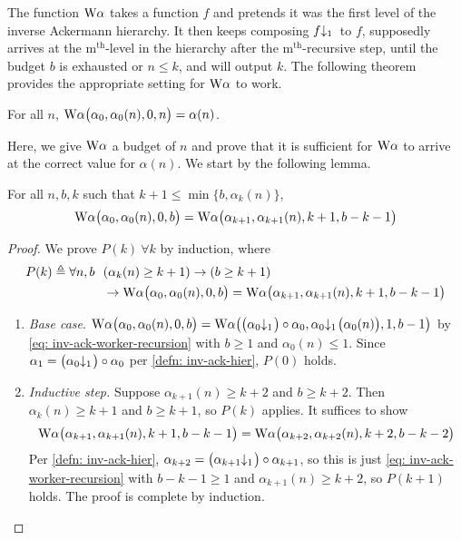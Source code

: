 The function $\text{W}\alpha$ takes a function $f$ and pretends it was the first level of the inverse Ackermann hierarchy. It then keeps composing $\cdt{f}{1}\ $ to $f$, supposedly arrives at the $\text{m}^{\text{th}}$-level in the hierarchy after the $\text{m}^{\text{th}}$-recursive step, until the budget $b$ is exhausted or $n\le k$, and will output $k$. The following theorem provides the appropriate setting for $\text{W}\alpha$ to work.
\begin{thm} \label{thm: inv-ack-worker-correct}
	For all $n$, $\text{W}\alpha\big(\alpha_0, \alpha_0(n), 0, n\big) = \alpha(n)$.
\end{thm}
Here, we give $\text{W}\alpha$ a budget of $n$ and prove that it is sufficient for $\text{W}\alpha$ to arrive at the correct value for $\alpha(n)$. We start by the following lemma.
\begin{lem} \label{lem: inv-ack-worker-intermediate}
	For all $n, b, k$ such that $k+1\le \min\big\{b, \alpha_k(n)\big\}$, \begin{equation*}
	\text{W}\alpha\big(\alpha_0, \alpha_0(n), 0, b\big) = \text{W}\alpha\big(\alpha_{k+1}, \alpha_{k+1}(n), k+1, b-k-1\big)
	\end{equation*}
\end{lem}
\begin{proof}
	 We prove $P(k) \ \forall k$ by induction, where
	 \begin{equation*}
	 \begin{aligned}
	 P(k) \triangleq \forall n, b \ \ & (\alpha_k(n)\ge k+1) \to (b\ge k+1)\\ & \to \text{W}\alpha\big(\alpha_0, \alpha_0(n), 0, b\big) = \text{W}\alpha\big(\alpha_{k+1}, \alpha_{k+1}(n), k+1, b-k-1\big)
	 \end{aligned}
	 \end{equation*}
	\begin{enumerate}[leftmargin=*]
		\item \emph{Base case}. $ \W\alpha\big(\alpha_0, \alpha_0(n), 0, b\big) = \W\alpha\big(\cdt{\big(\alpha_0}{1}\big)\circ \alpha_0, \cdt{\alpha_0}{1}\big(\alpha_0(n)\big), 1, b - 1\big) $ by
		\eqref{eq: inv-ack-worker-recursion} with $b\ge 1$ and $\alpha_0(n)\le 1$. Since $\alpha_1 = \big(\cdt{\alpha_0}{1}\big) \circ \alpha_0$ per \cref{defn: inv-ack-hier}, $P(0)$ holds.
		
		\item \emph{Inductive step.} Suppose $\alpha_{k+1}(n)\ge k+2$ and $b\ge k+2$. Then $\alpha_k(n)\ge k+1$ and $b\ge k+1$, so $P(k)$ applies. It suffices to show
		\begin{equation*}
		\text{W}\alpha\big(\alpha_{k+1}, \alpha_{k+1}(n), k+1, b-k-1\big)
		= \text{W}\alpha\big(\alpha_{k+2}, \alpha_{k+2}(n), k+2, b-k-2\big)
		\end{equation*}
		Per \cref{defn: inv-ack-hier}, $\alpha_{k+2} = \big(\cdt{\alpha_{k+1}}{1}\big)\circ \alpha_{k+1}$, so this is just \eqref{eq: inv-ack-worker-recursion} with $b - k - 1\ge 1$ and $\alpha_{k+1}(n)\ge k+2$, so $P(k+1)$ holds. The proof is complete by induction.\vspace*{-\baselineskip}
	\end{enumerate}
\end{proof}
